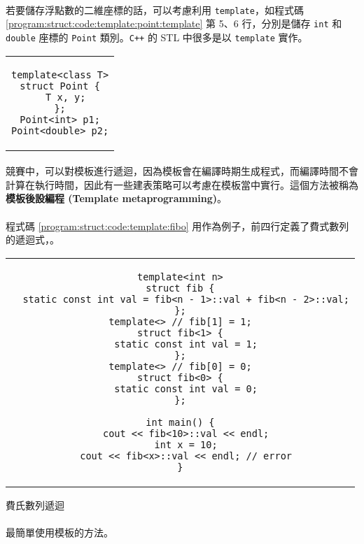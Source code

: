 \documentclass[12pt,a4paper,oneside]{report}
\begin{document}
\begin{CJK}{UTF8}{bkai}
\paragraph{}若要儲存浮點數的二維座標的話，可以考慮利用 \lstinline!template!，如程式碼 \ref{program:struct:code:template:point:template} 第 5、6 行，分別是儲存 \lstinline!int! 和 \lstinline!double! 座標的 \lstinline!Point! 類別。\texttt{C++} 的 STL 中很多是以 \lstinline!template! 實作。

\begin{code}[h!]
\centering
\begin{tabular}{c}
\begin{lstlisting}
template<class T>
struct Point {
  T x, y;
};
Point<int> p1;
Point<double> p2;
\end{lstlisting}
\end{tabular}
\caption{\lstinline!Point! 類別}
\label{program:struct:code:template:point:template}
\end{code}

\paragraph{}競賽中，可以對模板進行遞迴，因為模板會在編譯時期生成程式，而編譯時間不會計算在執行時間，因此有一些建表策略可以考慮在模板當中實行。這個方法被稱為\textbf{模板後設編程 (Template metaprogramming)}。
\paragraph{}程式碼 \ref{program:struct:code:template:fibo} 用作為例子，前四行定義了費式數列的遞迴式，。

\begin{code}[h!]
\centering
\begin{tabular}{c}
\begin{lstlisting}
template<int n>
struct fib {
  static const int val = fib<n - 1>::val + fib<n - 2>::val;
};
template<> // fib[1] = 1;
struct fib<1> {
  static const int val = 1;
};
template<> // fib[0] = 0;
struct fib<0> {
  static const int val = 0;
};

int main() {
  cout << fib<10>::val << endl;
  int x = 10;
  cout << fib<x>::val << endl; // error
}
\end{lstlisting}
\end{tabular}
\caption{費氏數列遞迴}
\label{program:struct:code:template:fibo}
\end{code}

\paragraph{}最簡單使用模板的方法。


\end{CJK}
\end{document}
